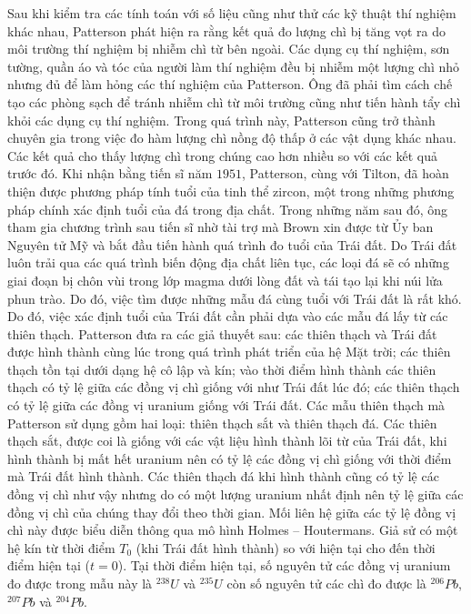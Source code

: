 \begin{multicols}{2}
	Sau khi kiểm tra các tính toán với số liệu cũng như thử các kỹ thuật thí nghiệm khác nhau, Patterson phát hiện ra rằng kết quả đo lượng chì bị tăng vọt ra do môi trường thí nghiệm bị nhiễm chì từ bên ngoài. Các dụng cụ thí nghiệm, sơn tường, quần áo và tóc của người làm thí nghiệm đều bị nhiễm một lượng chì nhỏ nhưng đủ để làm hỏng các thí nghiệm của Patterson. Ông đã phải tìm cách chế tạo các phòng sạch để tránh nhiễm chì từ môi trường cũng như tiến hành tẩy chì khỏi các dụng cụ thí nghiệm. Trong quá trình này, Patterson cũng trở thành chuyên gia trong việc đo hàm lượng chì nồng độ thấp ở các vật dụng khác nhau. Các kết quả cho thấy lượng chì trong chúng cao hơn nhiều so với các kết quả trước đó.
	Khi nhận bằng tiến sĩ năm $1951$, Patterson, cùng với Tilton, đã hoàn thiện được phương pháp tính tuổi của tinh thể zircon, một trong những phương pháp chính xác định tuổi của đá trong địa chất. Trong những năm sau đó, ông tham gia chương trình sau tiến sĩ nhờ tài trợ mà Brown xin được từ Ủy ban Nguyên tử Mỹ và bắt đầu tiến hành quá trình đo tuổi của Trái đất.
	\vskip 0.1cm
	Do Trái đất luôn trải qua các quá trình biến động địa chất liên tục, các loại đá sẽ có những giai đoạn bị chôn vùi trong lớp magma dưới lòng đất và tái tạo lại khi núi lửa phun trào. Do đó, việc tìm được những mẫu đá cùng tuổi với Trái đất là rất khó. Do đó, việc xác định tuổi của Trái đất cần phải dựa vào các mẫu đá lấy từ các thiên thạch. Patterson đưa ra các giả thuyết sau: các thiên thạch và Trái đất được hình thành cùng lúc trong quá trình phát triển của hệ Mặt trời; các thiên thạch tồn tại dưới dạng hệ cô lập và kín; vào thời điểm hình thành các thiên thạch có tỷ lệ giữa các đồng vị chì giống với như Trái đất lúc đó; các thiên thạch có tỷ lệ giữa các đồng vị uranium giống với Trái đất.
	\vskip 0.1cm
	Các mẫu thiên thạch mà Patterson sử dụng gồm hai loại: thiên thạch sắt và thiên thạch đá. Các thiên thạch sắt, được coi là giống với các vật liệu hình thành lõi từ của Trái đất, khi hình thành bị mất hết uranium nên có tỷ lệ các đồng vị chì giống với thời điểm mà Trái đất hình thành. Các thiên thạch đá khi hình thành cũng có tỷ lệ các đồng vị chì như vậy nhưng do có một lượng uranium nhất định nên tỷ lệ giữa các đồng vị chì của chúng thay đổi theo thời gian. Mối liên hệ giữa các tỷ lệ đồng vị chì này được biểu diễn thông qua mô hình Holmes -- Houtermans.
	\vskip 0.1cm
	Giả sử có một hệ kín từ thời điểm $T_0$ (khi Trái đất hình thành) so với hiện tại cho đến thời điểm hiện tại ($t=0$). Tại thời điểm hiện tại, số nguyên tử các đồng vị uranium đo được trong mẫu này là  $^{238}U$ và $^{235}U$ còn số nguyên tử các chì đo được là $^{206}Pb$, $^{207}Pb$ và $^{204}Pb$.

\end{multicols}
